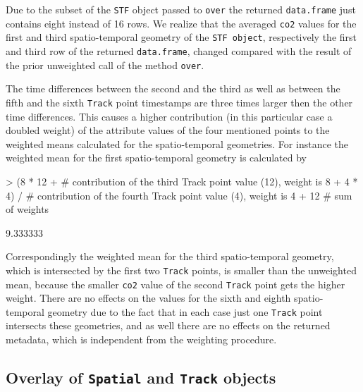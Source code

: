 \documentclass[12pt, oneside, a4paper]{scrbook}
\let\code=\texttt
\newcommand{\codeintitles}[1]{{\tt #1}} %
\begin{document}
Due to the subset of the \code{STF} object passed to \code{over} the returned \code{data.frame} just contains eight instead of 16 rows. 
We realize that the averaged \code{co2} values for the first and third spatio-temporal geometry of the \code{STF object}, respectively the first and third row of the returned \code{data.frame}, changed compared with the result of the prior unweighted call of the method \code {over}.
\par\medskip
The time differences between the second and the third as well as between the fifth and the sixth \code{Track} point timestamps are three times larger then the other time differences. 
This causes a higher contribution (in this particular case a doubled weight) of the attribute values of the four mentioned points to the weighted means calculated for the spatio-temporal geometries. 
For instance the weighted mean for the first spatio-temporal geometry is calculated by

\begin{small}
\begin{Schunk}
\begin{Sinput}
> (8 * 12 +   # contribution of the third Track point value (12), weight is 8
+  4 * 4) /   # contribution of the fourth Track point value (4), weight is 4
+  12         # sum of weights
\end{Sinput}
\begin{Soutput}
[1] 9.333333
\end{Soutput}
\end{Schunk}
\end{small}

Correspondingly the weighted mean for the third spatio-temporal geometry, which is intersected by the first two \code {Track} points, is smaller than the unweighted mean, because the smaller \code{co2} value of the second \code{Track} point gets the higher weight. 
There are no effects on the values for the sixth and eighth spatio-temporal geometry due to the fact that in each case just one \code{Track} point intersects these geometries, and as well there are no effects on the returned metadata, which is independent from the weighting procedure. 


\subsection{Overlay of \codeintitles{Spatial} and \codeintitles{Track} objects}
\label{subsec:overlayofspatial}
\end{document}
